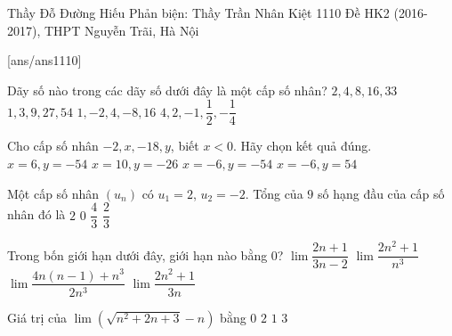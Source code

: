\begin{name}
{Thầy Đỗ Đường Hiếu 
	\newline Phản biện: Thầy Trần Nhân Kiệt}
{1110 Đề HK2 (2016-2017), THPT Nguyễn Trãi, Hà Nội}%
\end{name}
\setcounter{ex}{0}\setcounter{bt}{0}
[ans/ans1110]

\begin{ex}%
Dãy số nào trong các dãy số dưới đây là một cấp số nhân?
\choice
{$2,4,8,16,33$}
{$1,3,9,27,54$}
{\True $1,-2,4,-8,16$}
{$4,2,-1,\dfrac{1}{2},-\dfrac{1}{4}$}
\end{ex}


\begin{ex}%
Cho cấp số nhân $-2, x, -18, y$, biết $x<0$. Hãy chọn kết quả đúng.
\choice
{$x=6, y=-54$}
{$x=10, y=-26$}
{\True $x=-6, y=-54$}
{$x=-6, y=54$}
\end{ex}



\begin{ex}%
Một cấp số nhân $(u_n)$ có $u_1=2$, $u_2=-2$. Tổng của $9$ số hạng đầu của cấp số nhân đó là
\choice
{\True $2$}
{$0$}
{$\dfrac{4}{3}$}
{$\dfrac{2}{3}$}
\end{ex}


\begin{ex}%
Trong bốn giới hạn dưới đây, giới hạn nào bằng $0$?
\choice
{$\lim \dfrac{2n+1}{3n-2}$}
{\True $\lim \dfrac{2n^2+1}{n^3}$}
{$\lim \dfrac{4n(n-1)+n^3}{2n^3}$}
{$\lim \dfrac{2n^2+1}{3n}$}
\end{ex}


\begin{ex}%
Giá trị của $\lim \left(\sqrt{n^2+2n+3}-n\right)$ bằng
\choice
{$0$}
{$2$}
{\True $1$}
{$3$}
\end{ex}


